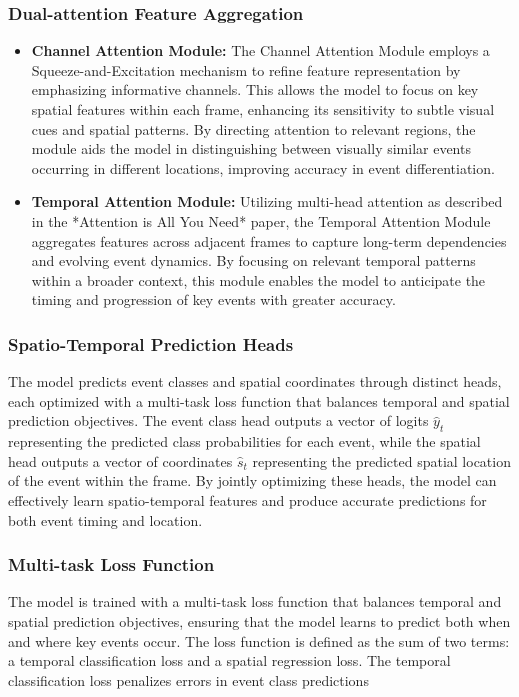 \documentclass[conference]{IEEEtran}
\begin{document}
\subsubsection{Dual-attention Feature Aggregation}
\begin{itemize}
    \item \textbf{Channel Attention Module:} The Channel Attention Module employs a Squeeze-and-Excitation mechanism to refine feature representation by emphasizing informative channels. This allows the model to focus on key spatial features within each frame, enhancing its sensitivity to subtle visual cues and spatial patterns. By directing attention to relevant regions, the module aids the model in distinguishing between visually similar events occurring in different locations, improving accuracy in event differentiation.

    \item \textbf{Temporal Attention Module:} Utilizing multi-head attention as described in the *Attention is All You Need* paper, the Temporal Attention Module aggregates features across adjacent frames to capture long-term dependencies and evolving event dynamics. By focusing on relevant temporal patterns within a broader context, this module enables the model to anticipate the timing and progression of key events with greater accuracy.

\end{itemize}
\subsubsection{Spatio-Temporal Prediction Heads}
The model predicts event classes and spatial coordinates through distinct heads, each optimized with a multi-task loss function that balances temporal and spatial prediction objectives. The event class head outputs a vector of logits \(\hat{y}_t\) representing the predicted class probabilities for each event, while the spatial head outputs a vector of coordinates \(\hat{s}_t\) representing the predicted spatial location of the event within the frame. By jointly optimizing these heads, the model can effectively learn spatio-temporal features and produce accurate predictions for both event timing and location.
\subsubsection{Multi-task Loss Function}
The model is trained with a multi-task loss function that balances temporal and spatial prediction objectives, ensuring that the model learns to predict both when and where key events occur. The loss function is defined as the sum of two terms: a temporal classification loss and a spatial regression loss. The temporal classification loss penalizes errors in event class predictions
\end{document}
